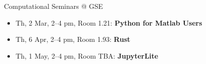 \documentclass[usepdftitle=false, aspectratio=169]{beamer}
\newcommand{\code}[1]{\texttt{\color{mygreen}#1}}
\begin{document}
% 
% 
% 



\begin{frame}
  {Computational Seminars @ GSE}

  \begin{itemize}\itemsep .5cm
    \item Th, 2 Mar, 2--4 pm, Room 1.21: \textbf{Python for Matlab Users}
    \item Th, 6 Apr, 2--4 pm, Room 1.93: \textbf{Rust}
    \item Th, 1 May, 2--4 pm, Room TBA: \textbf{JupyterLite} 
  \end{itemize}

\end{frame}
\end{document}
